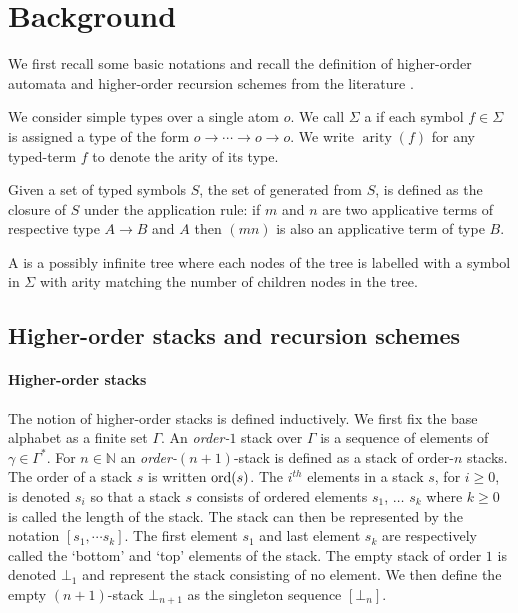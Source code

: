 \documentclass[a4paper]{article}[12pt]
\theoremstyle{remark}
\theoremstyle{definition}
\newcommand\arity{\mathop{\mathrm{arity}}}
\begin{document}
\section{Background}
We first recall some basic notations and recall the definition of higher-order automata and higher-order recursion schemes from the literature \cite{KNU02,hague-collaps-full}.

We consider simple types over a single atom $o$. We call $\Sigma$ a  if each symbol $f \in \Sigma$ is assigned a type of the form $o \longrightarrow  \cdots \longrightarrow o \longrightarrow  o$. We write $\arity(f)$ for any typed-term $f$ to denote the arity of its type.

Given a set of typed symbols $S$, the set of  generated from $S$, is defined as the closure of $S$ under the application rule: if $m$ and $n$ are two applicative terms of respective type $A\rightarrow B$ and $A$ then $(m n)$ is also an applicative term of type $B$.

A  is a possibly infinite tree where each nodes of the tree is labelled with a symbol in $\Sigma$ with arity matching the number of children nodes in the tree.


\subsection{Higher-order stacks and recursion schemes}

\paragraph{Higher-order stacks}
The notion of higher-order stacks is defined inductively. We first fix the base alphabet as a finite set $\Gamma$. An \emph{order-$1$} stack over $\Gamma$ is a sequence of elements of $\gamma \in \Gamma^*$. For $n \in \mathbb{N}$ an \emph{order-$(n+1)$}-stack is defined as a stack of order-$n$ stacks.
The order of a stack $s$ is written $\mathop{\mathrm{ord}}(s)$. The $i^{th}$ elements in a stack $s$, for $i\geq 0$, is denoted $s_i$ so that a stack $s$ consists of ordered elements $s_1$, $\dots$ $s_k$ where $k\geq0$ is called the length of the stack. The stack can then be represented by the notation $[s_1, \cdots s_k]$. The first element $s_1$ and last element $s_k$ are respectively called the `bottom' and `top' elements of the stack.
The empty stack of order $1$ is denoted $\bot_1$ and represent the stack consisting of no element. We then define the empty $(n+1)$-stack $\bot_{n+1}$ as the singleton sequence $[ \bot_n ]$.
\end{document}
